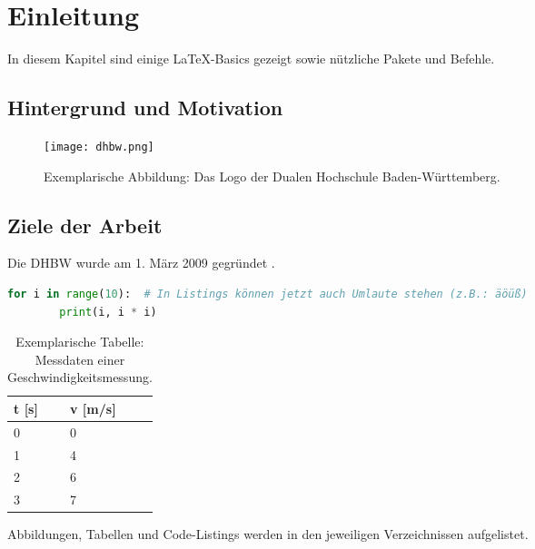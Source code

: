 
\chapter{Einleitung}

In diesem Kapitel sind einige LaTeX-Basics gezeigt sowie nützliche Pakete und Befehle.

\section{Hintergrund und Motivation}

\begin{figure}[ht]
    \centering
    \texttt{[image: dhbw.png]}
    \caption{Exemplarische Abbildung: Das Logo der Dualen Hochschule Baden-Württemberg.}
\end{figure}

\section{Ziele der Arbeit}

Die \ac{DHBW} wurde am 1. März 2009 gegründet \cite{DHBW-wirueberuns}.

\begin{minipage}{\linewidth}
    \begin{lstlisting}[language=Python, caption={Exemplarisches Code-Listing: Einfache for-Schleife mit Konsolenausgabe.}]
    for i in range(10):  # In Listings können jetzt auch Umlaute stehen (z.B.: äöüß) 
        print(i, i * i)
    \end{lstlisting}
\end{minipage}

\begin{table}[ht]
    \centering
    \begin{tabular}{|l|l|}
        \hline
        t {[}s{]} & v {[}m/s{]} \\ \hline
        0         & 0           \\ \hline
        1         & 4           \\ \hline
        2         & 6           \\ \hline
        3         & 7           \\ \hline
    \end{tabular}
    \caption{Exemplarische Tabelle: Messdaten einer Geschwindigkeitsmessung.}
\end{table}

Abbildungen, Tabellen und Code-Listings werden in den jeweiligen Verzeichnissen aufgelistet.

